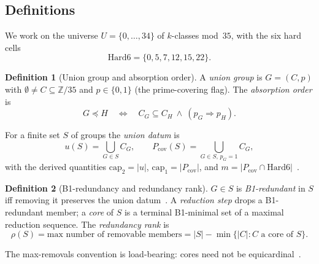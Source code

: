 \documentclass[11pt,a4paper]{article}
\theoremstyle{definition}
\newtheorem{definition}{Definition}
\begin{document}
\subsection{Definitions}
\label{sec:defs}

We work on the universe $U=\{0,\dots,34\}$ of $k$-classes mod~$35$, with the
six hard cells
\begin{equation}
  \label{eq:hard6}
  \text{Hard6}=\{0,5,7,12,15,22\}.
\end{equation}

\begin{definition}[Union group and absorption order]
  \label{def:group}
  A \emph{union group} is $G=(C,p)$ with $\emptyset\ne C\subseteq\mathbb{Z}/35$
  and $p\in\{0,1\}$ (the prime-covering flag).  The \emph{absorption order}
  is
  \begin{equation}
    \label{eq:absorp}
    G\preceq H\quad\Longleftrightarrow\quad
    C_G\subseteq C_H\ \land\ (p_G\Rightarrow p_H).
  \end{equation}
\end{definition}

For a finite set $S$ of groups the \emph{union datum} is
\begin{equation}
  \label{eq:datum}
  u(S)=\bigcup_{G\in S}C_G,\qquad
  P_{\mathrm{cov}}(S)=\bigcup_{G\in S,\,p_G=1}C_G,
\end{equation}
with the derived quantities $\mathrm{cap}_2=|u|$,
$\mathrm{cap}_1=|P_{\mathrm{cov}}|$, and
$m=|P_{\mathrm{cov}}\cap\text{Hard6}|$~\cite{D322}.

\begin{definition}[B1-redundancy and redundancy rank]
  \label{def:rho}
  $G\in S$ is \emph{B1-redundant} in $S$ iff removing it preserves the union
  datum~\cite{D308}.  A \emph{reduction step} drops a B1-redundant member; a
  \emph{core} of $S$ is a terminal B1-minimal set of a maximal reduction
  sequence.  The \emph{redundancy rank} is
  \begin{equation}
    \label{eq:rho}
    \rho(S)=\text{max number of removable members}
          =|S|-\min\{|C|:C\text{ a core of }S\}.
  \end{equation}
\end{definition}

The max-removals convention is load-bearing: cores need not be
equicardinal~\cite{D311}.
\end{document}
